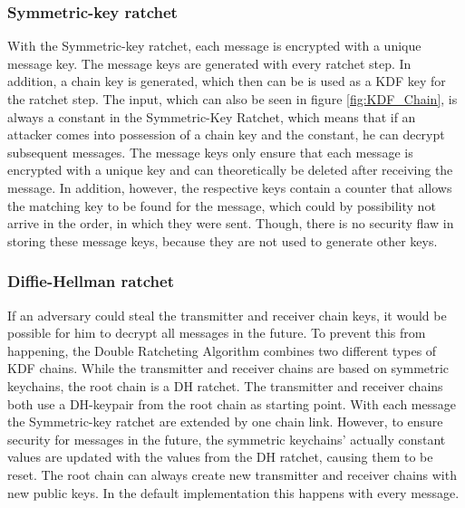 \documentclass[12pt,oneside,a4paper,parskip]{scrbook}
\begin{document}
\subsubsection{Symmetric-key ratchet}

With the Symmetric-key ratchet, each message is encrypted with a unique message key. The message keys are generated with every ratchet step. In addition, a chain key is generated, which then can be is used as a KDF key for the ratchet step. The input, which can also be seen in figure \ref{fig:KDF_Chain}, is always a constant in the Symmetric-Key Ratchet, which means that if an attacker comes into possession of a chain key and the constant, he can decrypt subsequent messages. The message keys only ensure that each message is encrypted with a unique key and can theoretically be deleted after receiving the message. In addition, however, the respective keys contain a counter that allows the matching key to be found for the message, which could by possibility not arrive in the order, in which they were sent. Though, there is no security flaw in storing these message keys, because they are not used to generate other keys.
\parencite{perrin_double_2016}

\subsubsection{Diffie-Hellman ratchet}

If an adversary could steal the transmitter and receiver chain keys, it would be possible for him to decrypt all messages in the future. To prevent this from happening, the Double Ratcheting Algorithm combines two different types of KDF chains. While the transmitter and receiver chains are based on symmetric keychains, the root chain is a DH ratchet. The transmitter and receiver chains both use a DH-keypair from the root chain as starting point. With each message the Symmetric-key ratchet are extended by one chain link. However, to ensure security for messages in the future, the symmetric keychains' actually constant values are updated with the values from the DH ratchet, causing them to be reset. The root chain can always create new transmitter and receiver chains with new public keys. In the default implementation this happens with every message.
\parencite{perrin_double_2016}

\end{document}

